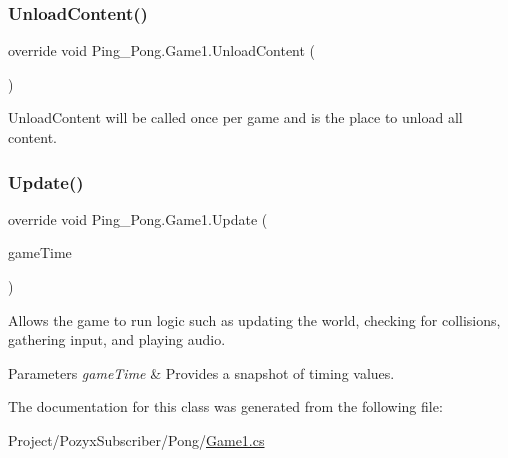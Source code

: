 \subsubsection{\texorpdfstring{Unload\+Content()}{UnloadContent()}}
{\footnotesize\ttfamily override void Ping\+\_\+\+Pong.\+Game1.\+Unload\+Content (\begin{DoxyParamCaption}{ }\end{DoxyParamCaption})\hspace{0.3cm}{\ttfamily [protected]}}



Unload\+Content will be called once per game and is the place to unload all content. 

\mbox{\label{class_ping___pong_1_1_game1_adcf5d3a66fa192e3318b14188dd0c34a}} 
\subsubsection{\texorpdfstring{Update()}{Update()}}
{\footnotesize\ttfamily override void Ping\+\_\+\+Pong.\+Game1.\+Update (\begin{DoxyParamCaption}\item[{Game\+Time}]{game\+Time }\end{DoxyParamCaption})\hspace{0.3cm}{\ttfamily [protected]}}



Allows the game to run logic such as updating the world, checking for collisions, gathering input, and playing audio. 


\begin{DoxyParams}{Parameters}
{\em game\+Time} & Provides a snapshot of timing values.\\
\hline
\end{DoxyParams}


The documentation for this class was generated from the following file\+:\begin{DoxyCompactItemize}
\item 
Project/\+Pozyx\+Subscriber/\+Pong/\hyperlink{_game1_8cs}{Game1.\+cs}\end{DoxyCompactItemize}
